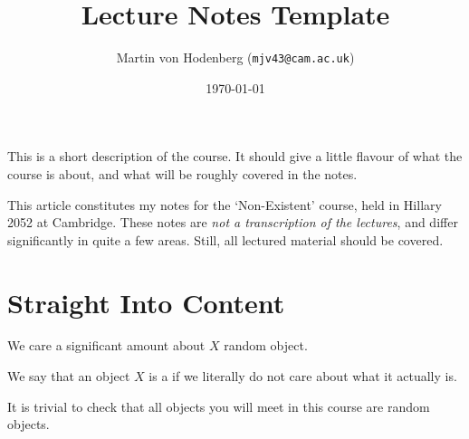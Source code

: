 \documentclass[a4paper]{scrartcl}
\title{Lecture Notes Template}
\author{Martin von Hodenberg (\texttt{mjv43@cam.ac.uk})}
\date{\today}
\begin{document}
\maketitle

This is a short description of the course. It should give a little flavour of what the course is about, and what will be roughly covered in the notes.

This article constitutes my notes for the `Non-Existent' course, held in Hillary 2052 at Cambridge. These notes are \emph{not a transcription of the lectures}, and differ significantly in quite a few areas. Still, all lectured material should be covered.



\tableofcontents


\section{Straight Into Content} 


We care a significant amount about $X$ random object.

\begin{definition}
    We say that an object $X$ is a  if we literally do not care about what it actually is.
\end{definition}

It is trivial to check that all objects you will meet in this course are random objects.
\end{document}
